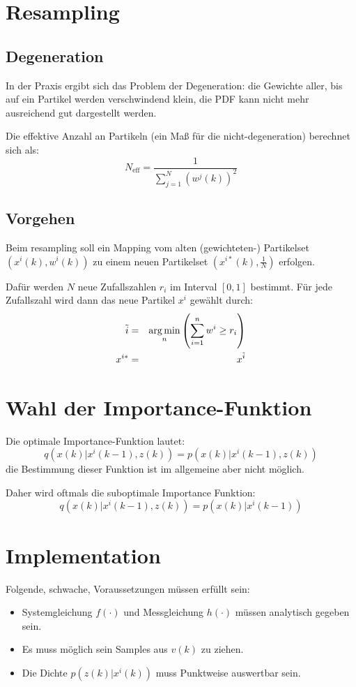 \section{Resampling}
\subsection{Degeneration}
In der Praxis ergibt sich das Problem der Degeneration: die Gewichte aller, bis auf ein Partikel werden verschwindend klein, die PDF kann nicht mehr ausreichend gut dargestellt werden.

Die effektive Anzahl an Partikeln (ein Maß für die nicht-degeneration) berechnet sich als:
\begin{equation*}
    N_\text{eff} = \frac{1}{\sum_{j=1}^N {(w^j(k))}^2}
\end{equation*}

\subsection{Vorgehen}
Beim resampling soll ein Mapping vom alten (gewichteten-) Partikelset $\left(x^i(k), w^i(k)\right)$ zu einem neuen Partikelset $\left(x^{i*}(k), \frac{1}{N}\right)$ erfolgen.

Dafür werden $N$ neue Zufallszahlen $r_i$ im Interval $[0,1]$ bestimmt. Für jede Zufallszahl wird dann das neue Partikel $x^i$ gewählt durch:
\begin{eqnarray*}
    \tilde{i} &=& \operatorname*{arg\,min}_n \left(\sum_{i=1}^n w^i \geq r_i \right) \\
    x^{i*} &=& x^{\tilde{i}}
\end{eqnarray*}

\section{Wahl der Importance-Funktion}
Die optimale Importance-Funktion lautet:
\begin{equation*}
    q(x(k)|x^i(k-1), z(k)) = p(x(k)|x^i(k-1),z(k))
\end{equation*}
die Bestimmung dieser Funktion ist im allgemeine aber nicht möglich.

Daher wird oftmals die suboptimale Importance Funktion:
\begin{equation*}
    q(x(k)|x^i(k-1), z(k)) = p(x(k)|x^i(k-1))
\end{equation*}

\section{Implementation}
Folgende, schwache, Voraussetzungen müssen erfüllt sein:
\begin{itemize}
    \item Systemgleichung $f(\cdot)$ und Messgleichung $h(\cdot)$ müssen analytisch
        gegeben sein.
    \item Es muss möglich sein Samples aus $v(k)$ zu ziehen.
    \item Die Dichte $p(z(k)|x^i(k))$ muss Punktweise auswertbar sein.
\end{itemize}

